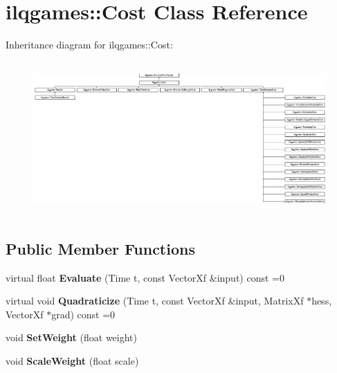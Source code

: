 \hypertarget{classilqgames_1_1_cost}{}\section{ilqgames\+:\+:Cost Class Reference}
\label{classilqgames_1_1_cost}
Inheritance diagram for ilqgames\+:\+:Cost\+:\begin{figure}[H]
\begin{center}
\leavevmode
\includegraphics[height=5.877551cm]{classilqgames_1_1_cost}
\end{center}
\end{figure}
\subsection*{Public Member Functions}
\begin{DoxyCompactItemize}
\item 
virtual float {\bfseries Evaluate} (Time t, const Vector\+Xf \&input) const =0\hypertarget{classilqgames_1_1_cost_a90ad7fc2697f0d8c3392dc5a079e40f9}{}\label{classilqgames_1_1_cost_a90ad7fc2697f0d8c3392dc5a079e40f9}

\item 
virtual void {\bfseries Quadraticize} (Time t, const Vector\+Xf \&input, Matrix\+Xf $\ast$hess, Vector\+Xf $\ast$grad) const =0\hypertarget{classilqgames_1_1_cost_a6857aa0bd5005626cd674d01ee544a74}{}\label{classilqgames_1_1_cost_a6857aa0bd5005626cd674d01ee544a74}

\item 
void {\bfseries Set\+Weight} (float weight)\hypertarget{classilqgames_1_1_cost_a099e8ab748c378007cd63293ba928cae}{}\label{classilqgames_1_1_cost_a099e8ab748c378007cd63293ba928cae}

\item 
void {\bfseries Scale\+Weight} (float scale)\hypertarget{classilqgames_1_1_cost_abcf058c9ca728990f8f5b3c6acf4ead2}{}\label{classilqgames_1_1_cost_abcf058c9ca728990f8f5b3c6acf4ead2}

\end{DoxyCompactItemize}
